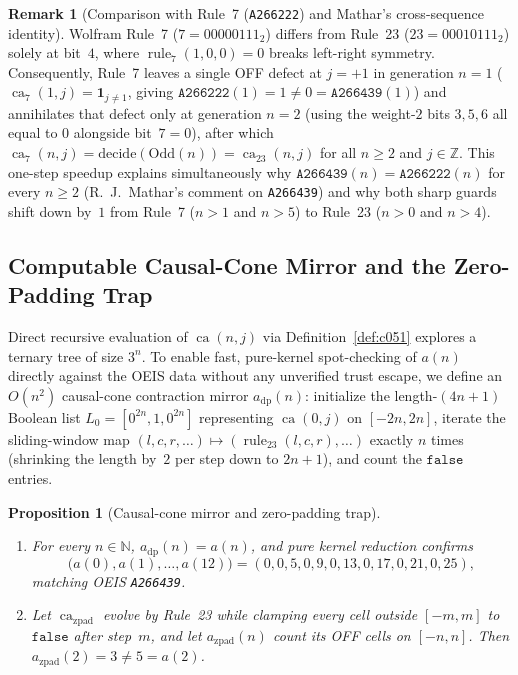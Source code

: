 \documentclass[11pt]{article}
\newtheorem{proposition}[theorem]{Proposition}
\theoremstyle{definition}
\newtheorem{remark}[theorem]{Remark}
\newcommand{\N}{\mathbb{N}}
\newcommand{\Z}{\mathbb{Z}}
\newcommand{\seq}[1]{\texttt{#1}}
\newcommand{\ruleTT}{\operatorname{rule}_{23}}
\newcommand{\ca}{\operatorname{ca}}
\begin{document}
\begin{remark}[Comparison with Rule~7 (\seq{A266222}) and Mathar's cross-sequence identity]
\label{rem:rule7}
Wolfram Rule~7 ($7 = 00000111_2$) differs from Rule~23 ($23 = 00010111_2$) solely at bit~$4$, where $\operatorname{rule}_7(1,0,0) = 0$ breaks left-right symmetry. Consequently, Rule~7 leaves a single OFF defect at $j = +1$ in generation $n = 1$ ($\ca_7(1, j) = \mathbf{1}_{j \ne 1}$, giving $\seq{A266222}(1) = 1 \ne 0 = \seq{A266439}(1)$) and annihilates that defect only at generation $n = 2$ (using the weight-$2$ bits $3, 5, 6$ all equal to $0$ alongside bit~$7 = 0$), after which $\ca_7(n, j) = \mathrm{decide}(\mathrm{Odd}(n)) = \ca_{23}(n, j)$ for all $n \ge 2$ and $j \in \Z$. This one-step speedup explains simultaneously why $\seq{A266439}(n) = \seq{A266222}(n)$ for every $n \ge 2$ (R.~J.\ Mathar's comment on \seq{A266439}) and why both sharp guards shift down by~$1$ from Rule~7 ($n > 1$ and $n > 5$) to Rule~23 ($n > 0$ and $n > 4$).
\end{remark}

\subsection{Computable Causal-Cone Mirror and the Zero-Padding Trap}

Direct recursive evaluation of $\ca(n, j)$ via Definition~\ref{def:c051} explores a ternary tree of size $3^n$. To enable fast, pure-kernel spot-checking of $a(n)$ directly against the OEIS data without any unverified trust escape, we define an $O(n^2)$ causal-cone contraction mirror $a_{\mathrm{dp}}(n)$: initialize the length-$(4n + 1)$ Boolean list $L_0 = [0^{2n}, 1, 0^{2n}]$ representing $\ca(0, j)$ on $[-2n, 2n]$, iterate the sliding-window map $(l, c, r, \dots) \mapsto (\ruleTT(l, c, r), \dots)$ exactly $n$ times (shrinking the length by~$2$ per step down to $2n + 1$), and count the $\mathtt{false}$ entries.

\begin{proposition}[Causal-cone mirror and zero-padding trap]
\label{prop:zero-pad}
\begin{enumerate}
\item[\textup{(a)}] For every $n \in \N$, $a_{\mathrm{dp}}(n) = a(n)$, and pure kernel reduction confirms
\[
\bigl(a(0), a(1), \dots, a(12)\bigr) = (0, 0, 5, 0, 9, 0, 13, 0, 17, 0, 21, 0, 25),
\]
matching OEIS \seq{A266439}.
\item[\textup{(b)}] Let $\ca_{\mathrm{zpad}}$ evolve by Rule~23 while clamping every cell outside $[-m, m]$ to $\mathtt{false}$ after step~$m$, and let $a_{\mathrm{zpad}}(n)$ count its OFF cells on $[-n, n]$. Then $a_{\mathrm{zpad}}(2) = 3 \ne 5 = a(2)$.
\end{enumerate}
\end{proposition}
\end{document}
